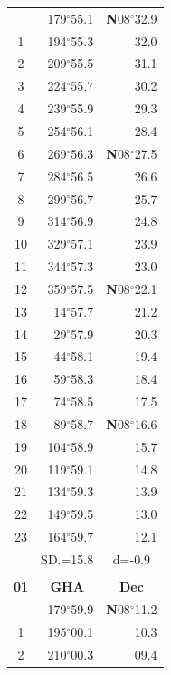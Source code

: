 \documentclass[10pt, a4paper]{report}
\begin{document}
\begin{scriptsize}
\begin{tabular*}{0.2\textwidth}[t]{@{\extracolsep{\fill}}|c|rr|}
\hline\rule{0pt}{2.6ex}\noindent
0 & 179$^\circ$55.1 & \textbf{N}08$^\circ$32.9\\
1 & 194$^\circ$55.3 & 32.0\\
2 & 209$^\circ$55.5 & 31.1\\
3 & 224$^\circ$55.7 & \raisebox{0.24ex}{\boldmath$\cdot$~\boldmath$\cdot$~~}30.2\\
4 & 239$^\circ$55.9 & 29.3\\
5 & 254$^\circ$56.1 & 28.4\\[2Pt]
6 & 269$^\circ$56.3 & \textbf{N}08$^\circ$27.5\\
7 & 284$^\circ$56.5 & 26.6\\
8 & 299$^\circ$56.7 & 25.7\\
9 & 314$^\circ$56.9 & \raisebox{0.24ex}{\boldmath$\cdot$~\boldmath$\cdot$~~}24.8\\
10 & 329$^\circ$57.1 & 23.9\\
11 & 344$^\circ$57.3 & 23.0\\[2Pt]
12 & 359$^\circ$57.5 & \textbf{N}08$^\circ$22.1\\
13 & 14$^\circ$57.7 & 21.2\\
14 & 29$^\circ$57.9 & 20.3\\
15 & 44$^\circ$58.1 & \raisebox{0.24ex}{\boldmath$\cdot$~\boldmath$\cdot$~~}19.4\\
16 & 59$^\circ$58.3 & 18.4\\
17 & 74$^\circ$58.5 & 17.5\\[2Pt]
18 & 89$^\circ$58.7 & \textbf{N}08$^\circ$16.6\\
19 & 104$^\circ$58.9 & 15.7\\
20 & 119$^\circ$59.1 & 14.8\\
21 & 134$^\circ$59.3 & \raisebox{0.24ex}{\boldmath$\cdot$~\boldmath$\cdot$~~}13.9\\
22 & 149$^\circ$59.5 & 13.0\\
23 & 164$^\circ$59.7 & 12.1\\
\hline
\rule{0pt}{2.4ex} & \multicolumn{1}{c}{SD.=15.8} & \multicolumn{1}{c|}{d=-0.9}\\
\hline
\multicolumn{1}{c}{}\\[-0.5ex]\hline
\multicolumn{1}{|c|}{\rule{0pt}{2.6ex}\textbf{01}} & \multicolumn{1}{c}{\textbf{GHA}} & \multicolumn{1}{c|}{\textbf{Dec}}\\
\hline\rule{0pt}{2.6ex}\noindent
0 & 179$^\circ$59.9 & \textbf{N}08$^\circ$11.2\\
1 & 195$^\circ$00.1 & 10.3\\
2 & 210$^\circ$00.3 & 09.4\\

\end{tabular*}
\end{scriptsize}
\end{document}
